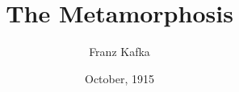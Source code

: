 \documentclass[12pt]{book}
\title{The Metamorphosis}
\author{Franz Kafka}
\date{October, 1915}
\begin{document}
    \maketitle
    \thispagestyle{empty}
    \pagebreak

    \begin{flushleft}
    \tableofcontents
    \end{flushleft}
    \vfill
    \pagebreak

    

    

    
\end{document}
